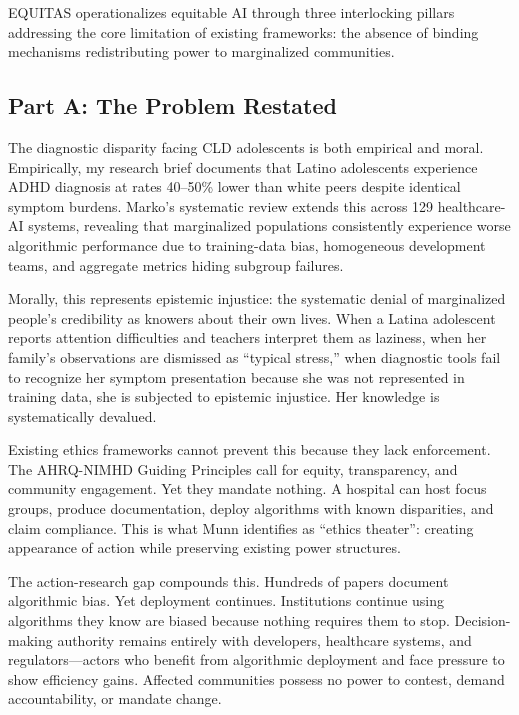 \documentclass[12pt,a4paper]{article}
\begin{document}
EQUITAS operationalizes equitable AI through three interlocking pillars addressing the core limitation of existing frameworks: the absence of binding mechanisms redistributing power to marginalized communities.

\subsection{Part A: The Problem Restated}

The diagnostic disparity facing CLD adolescents is both empirical and moral. Empirically, my research brief documents that Latino adolescents experience ADHD diagnosis at rates 40--50\% lower than white peers despite identical symptom burdens. Marko's systematic review extends this across 129 healthcare-AI systems, revealing that marginalized populations consistently experience worse algorithmic performance due to training-data bias, homogeneous development teams, and aggregate metrics hiding subgroup failures.

Morally, this represents epistemic injustice: the systematic denial of marginalized people's credibility as knowers about their own lives. When a Latina adolescent reports attention difficulties and teachers interpret them as laziness, when her family's observations are dismissed as ``typical stress,'' when diagnostic tools fail to recognize her symptom presentation because she was not represented in training data, she is subjected to epistemic injustice. Her knowledge is systematically devalued.

Existing ethics frameworks cannot prevent this because they lack enforcement. The AHRQ-NIMHD Guiding Principles call for equity, transparency, and community engagement. Yet they mandate nothing. A hospital can host focus groups, produce documentation, deploy algorithms with known disparities, and claim compliance. This is what Munn identifies as ``ethics theater'': creating appearance of action while preserving existing power structures.

The action-research gap compounds this. Hundreds of papers document algorithmic bias. Yet deployment continues. Institutions continue using algorithms they know are biased because nothing requires them to stop. Decision-making authority remains entirely with developers, healthcare systems, and regulators—actors who benefit from algorithmic deployment and face pressure to show efficiency gains. Affected communities possess no power to contest, demand accountability, or mandate change.
\end{document}

